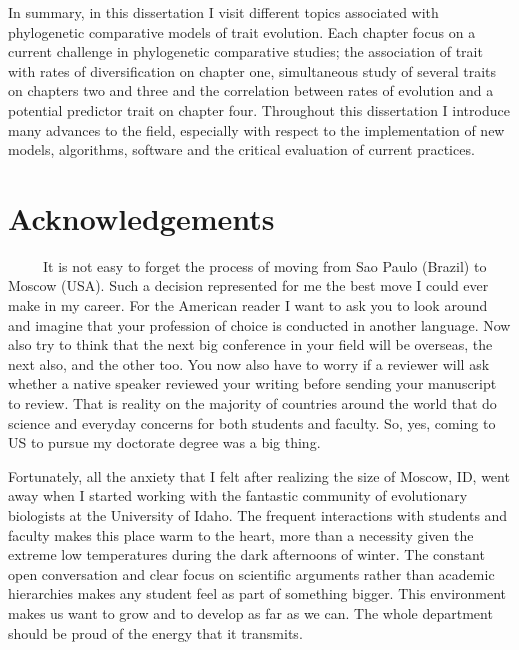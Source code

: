 In summary, in this dissertation I visit different topics associated with phylogenetic comparative models of trait evolution. Each chapter focus on a current challenge in phylogenetic comparative studies; the association of trait with rates of diversification on chapter one, simultaneous study of several traits on chapters two and three and the correlation between rates of evolution and a potential predictor trait on chapter four. Throughout this dissertation I introduce many advances to the field, especially with respect to the implementation of new models, algorithms, software and the critical evaluation of current practices.

\pagebreak

\section*{\large{Acknowledgements}}

\ \ \ \ \ It is not easy to forget the process of moving from Sao Paulo (Brazil) to Moscow (USA). Such a decision represented for me the best move I could ever make in my career. For the American reader I want to ask you to look around and imagine that your profession of choice is conducted in another language. Now also try to think that the next big conference in your field will be overseas, the next also, and the other too. You now also have to worry if a reviewer will ask whether a native speaker reviewed your writing before sending your manuscript to review. That is reality on the majority of countries around the world that do science and everyday concerns for both students and faculty. So, yes, coming to US to pursue my doctorate degree was a big thing.

Fortunately, all the anxiety that I felt after realizing the size of Moscow, ID, went away when I started working with the fantastic community of evolutionary biologists at the University of Idaho. The frequent interactions with students and faculty makes this place warm to the heart, more than a necessity given the extreme low temperatures during the dark afternoons of winter. The constant open conversation and clear focus on scientific arguments rather than academic hierarchies makes any student feel as part of something bigger. This environment makes us want to grow and to develop as far as we can. The whole department should be proud of the energy that it transmits.

